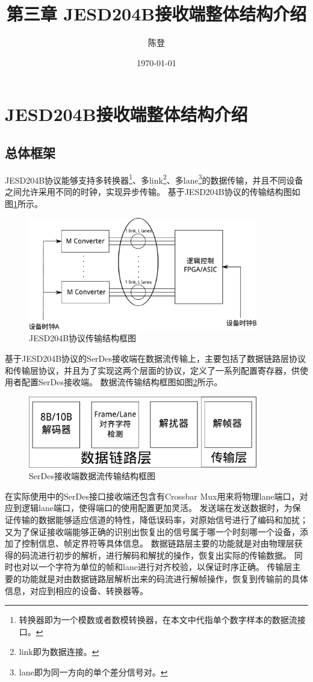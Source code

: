 \documentclass[UTF8]{ctexart}
\title{第三章 JESD204B接收端整体结构介绍}
\author{陈登}
\date{\today}
\begin{document}
\section{JESD204B接收端整体结构介绍}

\subsection{总体框架}

JESD204B协议能够支持多转换器\footnote{转换器即为一个模数或者数模转换器，在本文中代指单个数字样本的数据流接口。}、多link\footnote{link即为数据连接。}、多lane\footnote{lane即为同一方向的单个差分信号对。}的数据传输，并且不同设备之间允许采用不同的时钟，实现异步传输。
基于JESD204B协议的传输结构图如图\ref{fig:jesd204b_stuct}所示。

\begin{figure}[H]
\centering
\includegraphics[width=10cm]{./img/jesd204b_stuct.pdf}
\caption{JESD204B协议传输结构框图}
\label{fig:jesd204b_stuct}
\end{figure}

基于JESD204B协议的SerDes接收端在数据流传输上，主要包括了数据链路层协议和传输层协议，并且为了实现这两个层面的协议，定义了一系列配置寄存器，供使用者配置SerDes接收端。
数据流传输结构框图如图\ref{fig:serdes_sturct_link_transport_layer}所示。

\begin{figure}[H]
\centering
\includegraphics[width=10cm]{./img/serdes_sturct_link_transport_layer.pdf}
\caption{SerDes接收端数据流传输结构框图}
\label{fig:serdes_sturct_link_transport_layer}
\end{figure}

在实际使用中的SerDes接口接收端还包含有Crossbar Mux用来将物理lane端口，对应到逻辑lane端口，使得端口的使用配置更加灵活。
发送端在发送数据时，为保证传输的数据能够适应信道的特性，降低误码率，对原始信号进行了编码和加扰；又为了保证接收端能够正确的识别出恢复出的信号属于哪一个时刻哪一个设备，添加了控制信息、帧定界符等具体信息。
数据链路层主要的功能就是对由物理层获得的码流进行初步的解析，进行解码和解扰的操作，恢复出实际的传输数据。
同时也对以一个字符为单位的帧和lane进行对齐校验，以保证时序正确。
传输层主要的功能就是对由数据链路层解析出来的码流进行解帧操作，恢复到传输前的具体信息，对应到相应的设备、转换器等。
\end{document}
